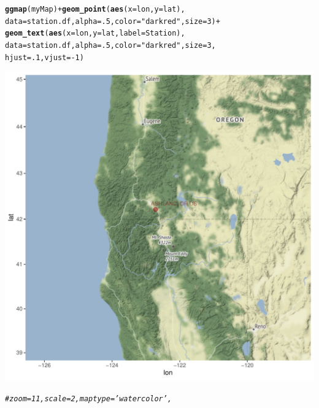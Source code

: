\documentclass{article}\usepackage[]{graphicx}\usepackage[]{color}
\makeatletter
\def\maxwidth{ %
  \ifdim\Gin@nat@width>\linewidth
    \linewidth
  \else
    \Gin@nat@width
  \fi
}
\newcommand{\hlnum}[1]{\textcolor[rgb]{0.686,0.059,0.569}{#1}}%
\newcommand{\hlstr}[1]{\textcolor[rgb]{0.192,0.494,0.8}{#1}}%
\newcommand{\hlcom}[1]{\textcolor[rgb]{0.678,0.584,0.686}{\textit{#1}}}%
\newcommand{\hlopt}[1]{\textcolor[rgb]{0,0,0}{#1}}%
\newcommand{\hlstd}[1]{\textcolor[rgb]{0.345,0.345,0.345}{#1}}%
\newcommand{\hlkwc}[1]{\textcolor[rgb]{0.333,0.667,0.333}{#1}}%
\newcommand{\hlkwd}[1]{\textcolor[rgb]{0.737,0.353,0.396}{\textbf{#1}}}%
\newenvironment{kframe}{%
 \def\at@end@of@kframe{}%
 \ifinner\ifhmode%
  \def\at@end@of@kframe{\end{minipage}}%
  \begin{minipage}{\columnwidth}%
 \fi\fi%
 \def\FrameCommand##1{\hskip\@totalleftmargin \hskip-\fboxsep
 \colorbox{shadecolor}{##1}\hskip-\fboxsep
     \hskip-\linewidth \hskip-\@totalleftmargin \hskip\columnwidth}%
 \MakeFramed {\advance\hsize-\width
   \@totalleftmargin\z@ \linewidth\hsize
   \@setminipage}}%
 {\par\unskip\endMakeFramed%
 \at@end@of@kframe}
\newenvironment{knitrout}{}{} %
\makeatother
\begin{document}
\begin{knitrout}
\begin{kframe}
{\ttfamily\noindent\itshape\color{messagecolor}{\#\# Source : http://tile.stamen.com/terrain/7/21/48.png}}\begin{alltt}
\hlkwd{ggmap}\hlstd{(myMap)} \hlopt{+} \hlkwd{geom_point}\hlstd{(}\hlkwd{aes}\hlstd{(}\hlkwc{x} \hlstd{= lon,} \hlkwc{y} \hlstd{= lat),}
      \hlkwc{data} \hlstd{= station.df,} \hlkwc{alpha} \hlstd{=} \hlnum{.5}\hlstd{,} \hlkwc{color}\hlstd{=}\hlstr{"darkred"}\hlstd{,} \hlkwc{size} \hlstd{=} \hlnum{3}\hlstd{)} \hlopt{+}
      \hlkwd{geom_text}\hlstd{(}\hlkwd{aes}\hlstd{(}\hlkwc{x} \hlstd{= lon,} \hlkwc{y} \hlstd{= lat,} \hlkwc{label}\hlstd{=Station),}
      \hlkwc{data} \hlstd{= station.df,} \hlkwc{alpha} \hlstd{=} \hlnum{.5}\hlstd{,} \hlkwc{color}\hlstd{=}\hlstr{"darkred"}\hlstd{,} \hlkwc{size} \hlstd{=} \hlnum{3}\hlstd{,}
      \hlkwc{hjust}\hlstd{=}\hlnum{.1}\hlstd{,} \hlkwc{vjust}\hlstd{=}\hlopt{-}\hlnum{1}\hlstd{)}
\end{alltt}
\end{kframe}
\includegraphics[width=\maxwidth]{figure/unnamed-chunk-5-1} 
\begin{kframe}\begin{alltt}
\hlcom{#zoom = 11, scale = 2, maptype ='watercolor',}


\end{alltt}
\end{kframe}
\end{knitrout}
\end{document}
